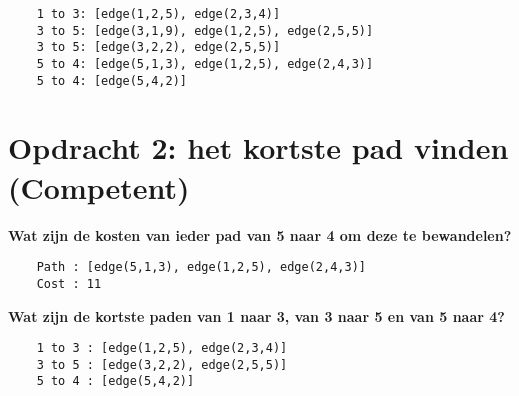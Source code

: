 \documentclass{uva-inf-article}
\begin{document}
\begin{lstlisting}
    1 to 3: [edge(1,2,5), edge(2,3,4)]
    3 to 5: [edge(3,1,9), edge(1,2,5), edge(2,5,5)]
    3 to 5: [edge(3,2,2), edge(2,5,5)]
    5 to 4: [edge(5,1,3), edge(1,2,5), edge(2,4,3)]
    5 to 4: [edge(5,4,2)]
\end{lstlisting}

\newpage
\section{Opdracht 2: het kortste pad vinden (Competent)}
\textbf{Wat zijn de kosten van ieder pad van 5 naar 4 om deze te bewandelen?}\\
\begin{lstlisting}
    Path : [edge(5,1,3), edge(1,2,5), edge(2,4,3)]
    Cost : 11
\end{lstlisting}
\textbf{Wat zijn de kortste paden van 1 naar 3, van 3 naar 5 en van 5 naar 4?}\\
\begin{lstlisting}
    1 to 3 : [edge(1,2,5), edge(2,3,4)]
    3 to 5 : [edge(3,2,2), edge(2,5,5)]
    5 to 4 : [edge(5,4,2)]
\end{lstlisting}


\printbibliography


\end{document}
